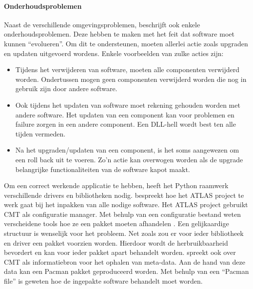 \paragraph{Onderhoudsproblemen}
Naast de verschillende omgevingsproblemen, beschrijft \citet{dolstra2006purely} ook enkele onderhoudsproblemen.
Deze hebben te maken met het feit dat software moet kunnen ``evolueren''.
Om dit te ondersteunen, moeten allerlei actie zoals upgraden en updaten uitgevoerd wordens.
Enkele voorbeelden van zulke acties zijn:
\begin{itemize}
\item Tijdens het verwijderen van software, moeten alle componenten verwijderd worden.
Ondertussen mogen geen componenten verwijderd worden die nog in gebruik zijn door andere software.
\item Ook tijdens het updaten van software moet rekening gehouden worden met andere software.
Het updaten van een component kan voor problemen en failure zorgen in een andere component.
Een DLL-hell wordt best ten alle tijden vermeden.
\item Na het upgraden/updaten van een component, is het soms aangewezen om een roll back uit te voeren.
Zo'n actie kan overwogen worden als de upgrade belangrijke functionaliteiten van de software kapot maakt.
\end{itemize}


Om een correct werkende applicatie te hebben, heeft het Python raamwerk verschillende drivers en bibliotheken nodig.
\citet{Obreshkov2008244} bespreekt hoe het ATLAS project te werk gaat bij het inpakken van alle nodige software.
Het ATLAS project gebruikt CMT als configuratie manager.
Met behulp van een configuratie bestand weten verscheidene tools hoe ze een pakket moeten afhandelen \citep{Obreshkov2008244}.
Een gelijkaardige structuur is wenselijk voor het probleem.
Net zoals \citet{Obreshkov2008244} zou er voor ieder bibliotheek en driver een pakket voorzien worden.
Hierdoor wordt de herbruikbaarheid bevordert en kan voor ieder pakket apart behandelt worden.
\citet{packAtlas} spreekt ook over CMT als informatiebron voor het ophalen van meta-data.
Aan de hand van deze data kan een Pacman pakket geproduceerd worden.
Met behulp van een ``Pacman file'' is geweten hoe de ingepakte software behandelt moet worden.


